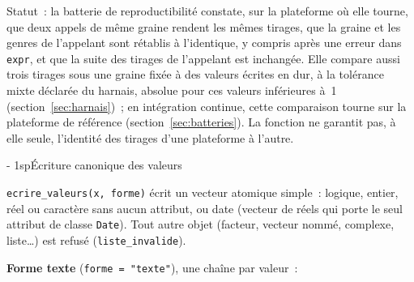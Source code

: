 \documentclass[a4paper,11pt]{article}
\makeatletter
\newcommand{\titrebandeau}[1]{%
  \noindent{\color{financeblue}\rule{\linewidth}{2.5pt}}
  \par\vspace{5mm}
  {\color{greenline}\raggedright\fontsize{19}{23}\bfseries\selectfont #1\par}
  \vspace{6mm}}
\newcommand{\charte@bandeau}[1]{%
  \parindent\z@ \everypar{\strut}%
  {\strut\par}\nobreak
  \titrebandeau{#1}\nobreak
  \kern\z@\nobreak\strut\par}
\newcommand{\charte@reserve}[1]{\par\ifinner\else\if@nobreak\else
  \penalty\z@ %
  \begingroup\setlength{\dimen@}{#1}%
  \dimen@ii\pagegoal \advance\dimen@ii-\pagetotal
  \ifdim\pagegoal=\maxdimen\else\ifdim\dimen@>\dimen@ii
    \vfil\penalty-\@M %
  \fi\fi\endgroup\fi\fi}
\renewcommand{\section}{\charte@reserve{12\baselineskip}%
  \@startsection{section}{1}{\z@}%
  {\z@}{1sp}{\normalfont\charte@bandeau}}
\newcommand{\code}[1]{\texttt{\small #1}}
\makeatother
\begin{document}
Statut~: la batterie de reproductibilité constate, sur la plateforme où
elle tourne, que deux appels de même graine rendent les mêmes tirages, que
la graine et les genres de l'appelant sont rétablis à l'identique, y
compris après une erreur dans \code{expr}, et que la suite des tirages de
l'appelant est inchangée. Elle compare aussi trois tirages sous une graine
fixée à des valeurs écrites en dur, à la tolérance mixte déclarée du
harnais, absolue pour ces valeurs inférieures à~1
(section~\ref{sec:harnais})~; en
intégration continue, cette comparaison tourne sur la plateforme de
référence (section~\ref{sec:batteries}). La fonction ne garantit pas, à
elle seule, l'identité des tirages d'une plateforme à l'autre.

\section{Écriture canonique des valeurs}
\label{sec:ecriture}

\code{ecrire\_valeurs(x, forme)} écrit un vecteur atomique simple~: logique,
entier, réel ou caractère sans aucun attribut, ou date (vecteur de réels qui
porte le seul attribut de classe \code{Date}). Tout autre objet (facteur,
vecteur nommé, complexe, liste\ldots) est refusé (\code{liste\_invalide}).

\textbf{Forme texte} (\code{forme = "texte"}), une chaîne par valeur~:
\end{document}
